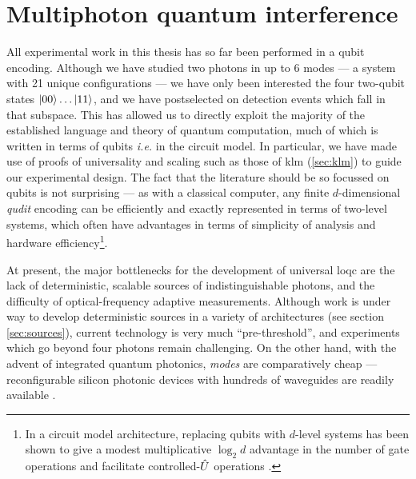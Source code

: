 \section{Multiphoton quantum interference} 
\label{sec:quantum-walks}

All experimental work in this thesis has so far been performed in a qubit encoding. Although we have studied two photons in up to 6 modes --- a system with 21 unique configurations --- we have only been interested the four two-qubit states $\mbox{$ | 00 \rangle $} \ldots \mbox{$ | 11 \rangle $}$, and we have postselected on detection events which fall in that subspace.  
This has allowed us to directly exploit the majority of the established language and theory of quantum computation, much of which is written in terms of qubits \emph{i.e.} in the circuit model. 
In particular, we have made use of proofs of universality and scaling such as those of \gls{klm} (\ref{sec:klm}) to guide our experimental design.
The fact that the literature should be so focussed on qubits is not surprising --- as with a classical computer, any finite $d$-dimensional \emph{qudit} encoding can be efficiently and exactly represented in terms of two-level systems, which often have advantages in terms of simplicity of analysis and hardware efficiency\footnote{In a circuit model architecture, replacing qubits with $d$-level systems has been shown to give a modest multiplicative $\log_2d$ advantage in the number of gate operations \cite{Muthukrishnan2000} and facilitate controlled-$\hat{U}$ operations \cite{Zhou2010}.}. 

At present, the major bottlenecks for the development of universal \gls{loqc} are the lack of deterministic, scalable sources of indistinguishable photons, and the difficulty of optical-frequency adaptive measurements. Although work is under way to develop deterministic sources in a variety of architectures (see section \ref{sec:sources}), current technology is very much ``pre-threshold'', and experiments which go beyond four photons remain challenging.  On the other hand, with the advent of integrated quantum photonics, \emph{modes} are comparatively cheap --- reconfigurable silicon photonic devices with hundreds of waveguides are readily available \cite{Sun2013}. 

